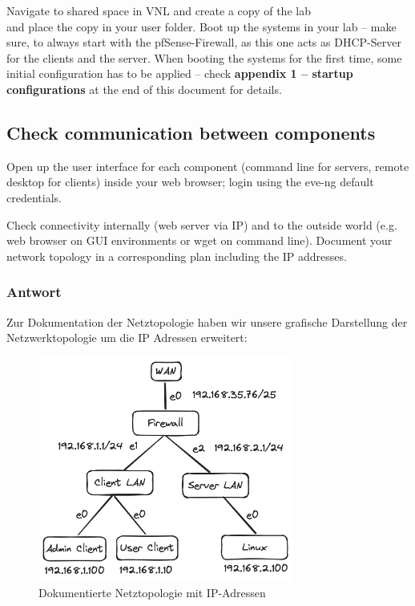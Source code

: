 \documentclass{article}
\begin{document}
Navigate to shared space in VNL and create a copy of the lab \\
and place the copy in your user folder. Boot up the systems in your lab – make sure, 
to always start with the pfSense-Firewall, as this one acts as DHCP-Server for the 
clients and the server. When booting the systems for the first time, some initial 
configuration has to be applied – check \textbf{appendix 1 – startup configurations} 
at the end of this document for details. 

\subsection{Check communication between components}

Open up the user interface for each component (command line for servers, remote 
desktop for clients) inside your web browser; login using the eve-ng default 
credentials. 

Check connectivity internally (web server via IP) and to the outside world (e.g. web 
browser on GUI environments or wget on command line). Document your network topology 
in a corresponding plan including the IP addresses. 

\subsubsection*{Antwort}

Zur Dokumentation der Netztopologie haben wir unsere grafische Darstellung der 
Netzwerktopologie um die IP Adressen erweitert:

\begin{figure}[H]
	\includegraphics[width=0.75\textwidth]{images/02}
	\centering
	\caption{Dokumentierte Netztopologie mit IP-Adressen}
\end{figure}
\end{document}
